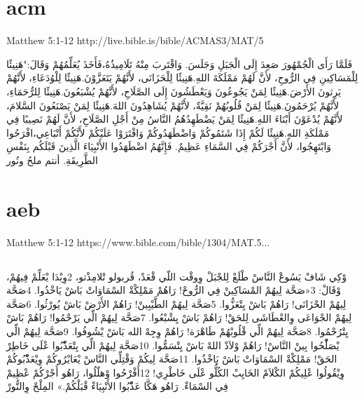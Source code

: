 \documentclass[12pt,fleqn,titlepage,twoside,a4paper]{book}
\begin{document}
\section{acm}

Matthew 5:1-12 http://live.bible.is/bible/ACMAS3/MAT/5

\begin{arab}[utf]

فَلَمَّا رَأَى الْجُمْهُورَ صَعِدَ إِلَى الْجَبَلِ وَجَلَسَ. وَاقْتَربَ مِنْهُ تَلَامِيذُهُ،فَأَخَذَ يُعَلِّمُهُمْ وَقَالَ:"هَنِيئًا لِلْمَسَاكِينِ فِي الرُّوحِ، لأَنَّ لَهُمْ مَمْلَكَةَ اللهِ.هَنِيئًا لِلْحَزَانَى، لأَنَّهُمْ يَتَعَزَّوْنَ.هَنِيئًا لِلْوُدَعَاءِ، لأَنَّهُمْ يَرِثونَ الأَرْضَ.هَنِيئًا لِمَنْ يَجُوعُونَ وَيَعْطَشُونَ إِلَى الصَّلَاحِ، لأَنَّهُمْ يُشْبَعُونَ.هَنِيئًا لِلرُّحَمَاءِ، لأَنَّهُمْ يُرْحَمُونَ.هَنِيئًا لِمَنْ قُلُوبُهُمْ نَقِيَّةٌ، لأَنَّهُمْ يُشَاهِدُونَ اللهَ.هَنِيئًا لِمَنْ يَصْنَعُونَ السَّلامَ، لأَنَّهُمْ يُدْعَوْنَ أَبْنَاءَ اللهِ.هَنِيئًا لِمَنْ يَضْطَهِدُهُمُ النَّاسُ مِنْ أَجْلِ الصَّلَاحِ، لأَنَّ لَهُمْ نَصِيبًا فِي مَمْلَكَةِ اللهِ.هَنِيئًا لَكُمْ إِذَا شَتَمُوكُمْ وَاضْطَهَدُوكُمْ وَافْتَرَوْا عَلَيْكُمْ لأَنَّكُمْ أَتْبَاعِي،افْرَحُوا وَابْتَهِجُوا، لأَنَّ أَجْرَكُمْ فِي السَّمَاءِ عَظِيمٌ. فَإِنَّهُمُ اضْطَهَدُوا الأَنْبِيَاءَ الَّذِينَ قَبْلَكُم بِنَفْسِ الطَّرِيقَةِ. أنتم ملحُ ونُور
\end{arab}

\section{aeb}

Matthew 5:1-12 https://www.bible.com/bible/1304/MAT.5...

\begin{arab}[utf]
\section*{}


وْكِي شَافْ يَسُوعْ النَّاسْ طْلَعْ لِلجْبَلْ وِوقْت اللّي قْعَدْ، قُربولو تْلامِذْتو، 2وِبْدَا يْعَلِّمْ فِيهُمْ، وْقَالْ:
3«صَحَّة لِيهُمْ المْسَاكِينْ فِي الرُّوحْ!
رَاهُمْ مَمْلِكْةْ السْمَاوَاتْ بَاشْ يَاخْذُوا.
4صَحَّة لِيهُمْ الحْزَانَى!
رَاهُمْ بَاشْ يِتْعَزُّوا.
5صَحَّة لِيهُمْ الطَّيْبِينْ!
رَاهُمْ الأَرْضْ بَاشْ يُورْثُوا.
6صَحَّة لِيهُمْ الجْوَاعَى وِالعْطَاشَى لِلحَقْ!
رَاهُمْ بَاشْ يِشْبْعُوا.
7صَحَّة لِيهُمْ الِّي يَرْحْمُوا!
رَاهُمْ بَاشْ يِتْرُحْمُوا.
8صَحَّة لِيهُمْ الِّي قْلُوبْهُمْ طَاهْرَة!
رَاهُمْ وِجِهْ الله بَاشْ يْشُوفُوا.
9صَحَّة لِيهُمْ الِّي يْصَلّْحُوا بِينْ النَّاسْ!
رَاهُمْ وْلاَدْ اللهْ بَاشْ يِتْسَمُّوا.
10صَحَّة لِيهُمْ الِّي يِتْعَذّْبُوا عْلَى خَاطِرْ الحَقْ!
مَمْلِكْةْ السْمَاوَاتْ بَاشْ يَاخْذُوا.
11صَحَّة لِيكُمْ وَقْتِلِّي النَّاسْ يْعَايْرُوكُمْ وِيْعَذّْبُوكُمْ وِيْقُولُوا عْلِيكُمْ الكْلاَمْ الخَايِبْ الكُلُّو عْلَى خَاطْرِي! 12أَفْرْحُوا وْهلّلُوا، رَاهُو أَجْرْكُمْ عْظِيمْ فِي السْمَاءْ. رَاهُو هَكَّا عَذّْبُوا الأَنْبِيَاءْ قْبَلْكُمْ.»
المِلْحْ وِالنُّورْ

\end{arab}
\end{document}
